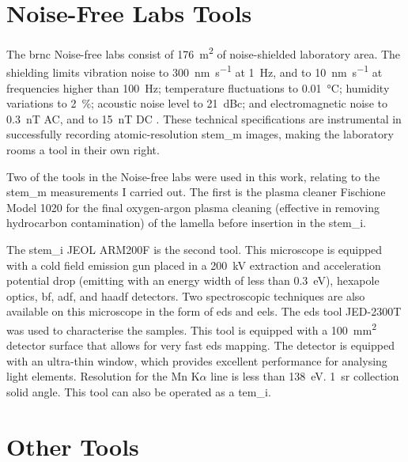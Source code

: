 \section{Noise-Free Labs Tools}

The \acs{brnc} Noise-free labs consist of \qty{176}{\m^2} of noise-shielded laboratory area. The shielding limits vibration noise to \qty{300}{\nm\per\s} at \qty{1}{Hz}, and to \qty{10}{\nm\per\s} at frequencies higher than \qty{100}{Hz}; temperature fluctuations to \qty{0.01}{\degreeCelsius}; humidity variations to \qty{2}{\%}; acoustic noise level to \qty{21}{dBc}; and electromagnetic noise to \qty{0.3}{\nano\tesla} AC, and to \qty{15}{\nano\tesla} DC \cite{Lörtscher_Noise_Free}. These technical specifications are instrumental in successfully recording atomic-resolution \acf{stem_m} images, making the laboratory rooms a tool in their own right.
\par
Two of the tools in the Noise-free labs were used in this work, relating to the \acs{stem_m} measurements I carried out. The first is the plasma cleaner Fischione Model 1020 for the final oxygen-argon plasma cleaning (effective in removing hydrocarbon contamination) of the lamella before insertion in the \acs{stem_i}. 
\par 
The \acl{stem_i} JEOL ARM200F is the second tool. This microscope is equipped with a cold field emission gun placed in a \qty{200}{\kV} extraction and acceleration potential drop (emitting with an energy width of less than \qty{0,3}{eV}), hexapole optics, \acf{bf}, \acf{adf}, and \acf{haadf} detectors. Two spectroscopic techniques are also available on this microscope in the form of \acf{eds} and \acf{eels}. The \acs{eds} tool JED-2300T was used to characterise the samples. This tool is equipped with a \qty{100}{\mm^2} detector surface that allows for very fast \acs{eds} mapping. The detector is equipped with an ultra-thin window, which provides excellent performance for analysing light elements. Resolution for the Mn K$\alpha$ line is less than \qty{138}{\eV}. \qty{1}{\steradian} collection solid angle. This tool can also be operated as a \acf{tem_i}.

\section{Other Tools}

